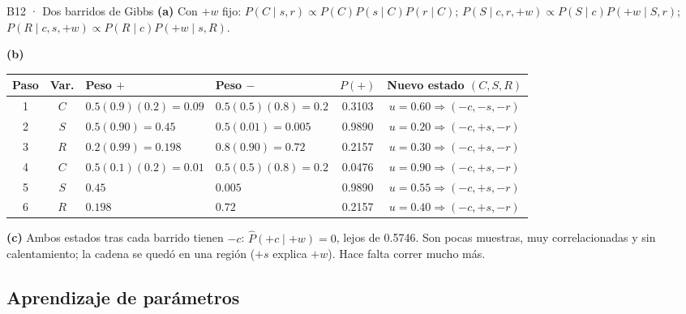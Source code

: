 \begin{solucion}{B12 · Dos barridos de Gibbs}
\textbf{(a)} Con $+w$ fijo:
$P(C\mid s,r)\propto P(C)P(s\mid C)P(r\mid C)$;\quad
$P(S\mid c,r,+w)\propto P(S\mid c)P(+w\mid S,r)$;\quad
$P(R\mid c,s,+w)\propto P(R\mid c)P(+w\mid s,R)$.

\textbf{(b)}
\begin{center}\small
\begin{tabular}{c c l l c c}
\toprule
Paso & Var. & Peso $+$ & Peso $-$ & $P(+)$ & Nuevo estado $(C,S,R)$\\\midrule
1 & $C$ & $0.5(0.9)(0.2)=0.09$ & $0.5(0.5)(0.8)=0.2$ & 0.3103 & $u=0.60\Rightarrow(-c,-s,-r)$\\
2 & $S$ & $0.5(0.90)=0.45$ & $0.5(0.01)=0.005$ & 0.9890 & $u=0.20\Rightarrow(-c,+s,-r)$\\
3 & $R$ & $0.2(0.99)=0.198$ & $0.8(0.90)=0.72$ & 0.2157 & $u=0.30\Rightarrow(-c,+s,-r)$\\
4 & $C$ & $0.5(0.1)(0.2)=0.01$ & $0.5(0.5)(0.8)=0.2$ & 0.0476 & $u=0.90\Rightarrow(-c,+s,-r)$\\
5 & $S$ & $0.45$ & $0.005$ & 0.9890 & $u=0.55\Rightarrow(-c,+s,-r)$\\
6 & $R$ & $0.198$ & $0.72$ & 0.2157 & $u=0.40\Rightarrow(-c,+s,-r)$\\\bottomrule
\end{tabular}
\end{center}
\textbf{(c)} Ambos estados tras cada barrido tienen $-c$: $\hat P(+c\mid+w)=0$, lejos de 0.5746. Son pocas muestras, muy correlacionadas
y sin calentamiento; la cadena se quedó en una región ($+s$ explica $+w$). Hace falta correr mucho más.
\end{solucion}

\subsection{Aprendizaje de parámetros}

